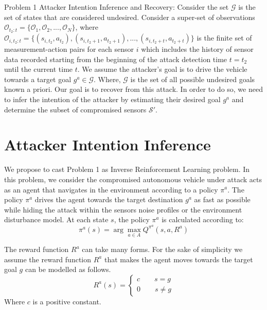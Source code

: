 \documentclass[conference]{IEEEtran}
\begin{document}
Problem 1 Attacker Intention Inference and Recovery: Consider the set $\mathcal{G}$ is the set of states that are considered undesired. Consider a super-set of observations $\mathcal{O}_{t_2:t} = \{\mathcal{O}_1, \mathcal{O}_2, ..., \mathcal{O}_N\}$, where $\mathcal{O}_{i,t_2:t} = \{(s_{i,t_2}, a_{t_2}), (s_{i,t_2+1}, a_{t_2+1}), ..., (s_{i,t_2+t}, a_{t_2+t})\}$ is the finite set of measurement-action pairs for each sensor $i$ which includes the history of sensor data recorded starting from the beginning of the attack detection time  $t = t_2$ until the current time $t$. We assume the attacker's goal is to drive the vehicle towards a target goal $g^a \in \mathcal{G}$. Where, $\mathcal{G}$ is the set of all possible undesired goals known a priori. Our goal is to recover from this attack. In order to do so, we need to infer the intention of the attacker by estimating their desired goal $g^a$ and determine the subset of compromised sensors $\mathcal{S'}$. 

\section{Attacker Intention Inference}\label{sec:intpredic}
We propose to cast Problem 1 as Inverse Reinforcement Learning problem. In this problem, we consider the compromised autonomous vehicle under attack acts as an agent that navigates in the environment according to a policy $\pi^a$. The policy $\pi^a$ drives the agent towards the target destination $g^a$ as fast as possible while hiding the attack within the sensors noise profiles or the environment disturbance model. At each state $s$, the policy $\pi^a$ is calculated according to:
\[ \pi^a(s) = \arg\!\max_{a\in A} Q^{\pi^a}(s,a,R^a)\]

The reward function $R^a$ can take many forms. For the sake of simplicity we assume the reward function $R^a$ that makes the agent moves towards the target goal $g$ can be modelled as follows. 
  \begin{equation}
    R^a(s)=\left\{
                \begin{array}{ll}
                  c\hspace{2em} s = g\\
                  0\hspace{2em} s \ne g
                \end{array}
              \right.
  \end{equation}
Where $c$ is a positive constant.
\end{document}
